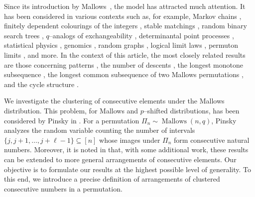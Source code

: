 \documentclass[letterpaper,11pt]{article}
\theoremstyle{definition}
\theoremstyle{remark}
\DeclareMathOperator{\Mallow}{Mallows}
\begin{document}
Since its introduction by Mallows~\cite{Mallows1957}, the model has attracted much attention. It has been considered in various contexts such as, for example, Markov chains \cite{BenjaminiEtal2005,DiaconisEtal2000}, finitely dependent colourings of the integers \cite{HolroydEtal2020}, stable matchings \cite{AngelEtal2021}, random binary search trees \cite{AddarioBerryEtal2021}, $q$--analogs of exchangeability \cite{GnedinOlshanski2010,GnedinOlshanski2012}, determinantal point processes \cite{BorodinETAL2010}, statistical physics \cite{Starr2009,StarrWalters2018}, genomics \cite{FangETAL2021}, random graphs \cite{Spagetti}, logical limit laws \cite{MullerSkermanVer2025}, permuton limits \cite{JasinskaRath2025}, and more. In the context of this article, the most closely related results are those concerning patterns \cite{CraneDesalvo2017,CrameDeSalvoElizalde2018,Pinsky2021,Dubach2026}, the number of descents \cite{He2021}, the longest monotone subsequence \cite{BasuBhat17,BhatnagarPeled2015,MuellerStarr2013}, the longest common subsequence of two Mallows permutations \cite{Jin2019}, and the cycle structure \cite{GladkichPeled2018,HeMV23}.


We investigate the clustering of consecutive elements under the Mallows distribution. This problem, for Mallows and $p$--shifted distributions, has been considered by Pinsky in \cite{Pinsky2022}. For a permutation $\varPi_n \sim \Mallow(n,q)$, Pinsky analyzes the random variable counting the number of intervals $\{j,j+1,\ldots,j+\ell-1\} \subseteq [n]$ whose images under $\varPi_n$ form consecutive natural numbers. Moreover, it is noted in \cite{Pinsky2022} that, with some additional work, these results can be extended to more general arrangements of consecutive elements. Our objective is to formulate our results at the highest possible level of generality. To this end, we introduce a precise definition of arrangements of clustered consecutive numbers in a permutation.
\end{document}
